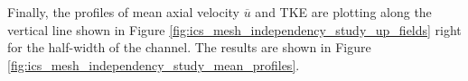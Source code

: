 Finally, the profiles of mean axial velocity $\overline{u}$ and TKE are plotting along the vertical line shown in Figure \ref{fig:ics_mesh_independency_study_up_fields} right for the half-width of the channel. The results are shown in Figure \ref{fig:ics_mesh_independency_study_mean_profiles}. 












\clearpage


%
%
%

